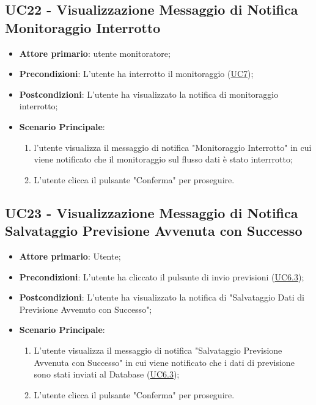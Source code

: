 
	\label{par:UC22}
	\subsection{UC22 - Visualizzazione Messaggio di Notifica Monitoraggio Interrotto}
		\begin{itemize}
			\item\textbf{Attore primario}: utente monitoratore;
			\item\textbf{Precondizioni}: L’utente ha interrotto il monitoraggio (\hyperref[par:UC7]{UC7});
			\item\textbf{Postcondizioni}: L’utente ha visualizzato la notifica di monitoraggio interrotto;
			\item\textbf{Scenario Principale}: 
				\begin{enumerate} 
					\item l’utente visualizza il messaggio di notifica "Monitoraggio Interrotto" in cui viene notificato che il monitoraggio sul flusso dati è stato interrrotto;
					\item L'utente clicca il pulsante "Conferma" per proseguire.		
				\end{enumerate}		
		\end{itemize}


		
	\label{par:UC23}
	\subsection{UC23 - Visualizzazione Messaggio di Notifica Salvataggio Previsione Avvenuta con Successo}	\begin{itemize}
			\item\textbf{Attore primario}: Utente;
			\item\textbf{Precondizioni}: L'utente ha cliccato il pulsante di invio previsioni (\hyperref[par:UC6.3]{UC6.3});
			\item\textbf{Postcondizioni}: L'utente ha visualizzato la notifica di "Salvataggio Dati di Previsione Avvenuto con Successo"; 
			\item\textbf{Scenario Principale}: 
				\begin{enumerate} 
					\item L’utente visualizza il messaggio di notifica "Salvataggio Previsione Avvenuta con Successo" in cui viene notificato che i dati di previsione sono stati inviati al Database (\hyperref[par:UC6.3]{UC6.3});
					\item L'utente clicca il pulsante "Conferma" per proseguire.		
				\end{enumerate}		
		\end{itemize}

